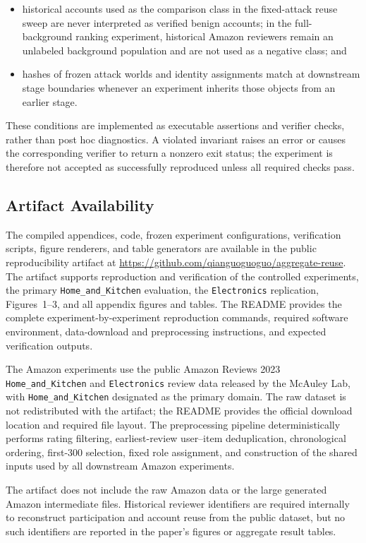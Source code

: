 \begin{itemize}
          item degrees under degree-preserving randomization, while the
          evidence-only and topology-only controls isolate the intended
          information channels;
    \item historical accounts used as the comparison class in the fixed-attack
reuse sweep are never interpreted as verified benign accounts; in the
full-background ranking experiment, historical Amazon reviewers remain an
unlabeled background population and are not used as a negative class; and
    \item hashes of frozen attack worlds and identity assignments match at
          downstream stage boundaries whenever an experiment inherits those
          objects from an earlier stage.
\end{itemize}

These conditions are implemented as executable assertions and verifier checks,
rather than post hoc diagnostics. A violated invariant raises an error or causes
the corresponding verifier to return a nonzero exit status; the experiment is
therefore not accepted as successfully reproduced unless all required checks
pass.


\subsection{Artifact Availability}
\label{sec:supp-artifact}

The compiled appendices, code, frozen experiment configurations,
verification scripts, figure renderers, and table generators are available in
the public reproducibility artifact at
\url{https://github.com/qianguoguoguo/aggregate-reuse}.
The artifact supports reproduction and verification of the controlled
experiments, the primary \texttt{Home\_and\_Kitchen} evaluation, the
\texttt{Electronics} replication, Figures~1--3, and all appendix
figures and tables. The README provides the complete
experiment-by-experiment reproduction commands, required software
environment, data-download and preprocessing instructions, and
expected verification outputs.

The Amazon experiments use the public Amazon Reviews 2023
\texttt{Home\_and\_Kitchen} and \texttt{Electronics} review data released
by the McAuley Lab, with \texttt{Home\_and\_Kitchen} designated as the
primary domain.
The raw dataset is not redistributed with the artifact; the README provides
the official download location and required file layout. The preprocessing
pipeline deterministically performs rating filtering, earliest-review
user--item deduplication, chronological ordering, first-300 selection, fixed
role assignment, and construction of the shared inputs used by all downstream
Amazon experiments.

The artifact does not include the raw Amazon data or the large
generated Amazon intermediate files. Historical reviewer identifiers are required
internally to reconstruct participation and account reuse from the public
dataset, but no such identifiers are reported in the paper's figures or
aggregate result tables.
